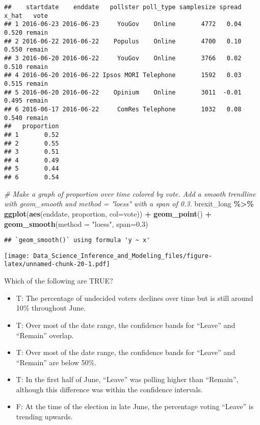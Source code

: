 \documentclass[
]{article}
\newenvironment{Shaded}{\begin{snugshade}}{\end{snugshade}}
\newcommand{\CommentTok}[1]{\textcolor[rgb]{0.56,0.35,0.01}{\textit{#1}}}
\newcommand{\DataTypeTok}[1]{\textcolor[rgb]{0.13,0.29,0.53}{#1}}
\newcommand{\FloatTok}[1]{\textcolor[rgb]{0.00,0.00,0.81}{#1}}
\newcommand{\KeywordTok}[1]{\textcolor[rgb]{0.13,0.29,0.53}{\textbf{#1}}}
\newcommand{\NormalTok}[1]{#1}
\newcommand{\OperatorTok}[1]{\textcolor[rgb]{0.81,0.36,0.00}{\textbf{#1}}}
\newcommand{\StringTok}[1]{\textcolor[rgb]{0.31,0.60,0.02}{#1}}
\providecommand{\tightlist}{%
  \setlength{\itemsep}{0pt}\setlength{\parskip}{0pt}}
\begin{document}
\begin{verbatim}
##    startdate    enddate   pollster poll_type samplesize spread x_hat   vote
## 1 2016-06-23 2016-06-23     YouGov    Online       4772   0.04 0.520 remain
## 2 2016-06-22 2016-06-22    Populus    Online       4700   0.10 0.550 remain
## 3 2016-06-20 2016-06-22     YouGov    Online       3766   0.02 0.510 remain
## 4 2016-06-20 2016-06-22 Ipsos MORI Telephone       1592   0.03 0.515 remain
## 5 2016-06-20 2016-06-22    Opinium    Online       3011  -0.01 0.495 remain
## 6 2016-06-17 2016-06-22     ComRes Telephone       1032   0.08 0.540 remain
##   proportion
## 1       0.52
## 2       0.55
## 3       0.51
## 4       0.49
## 5       0.44
## 6       0.54
\end{verbatim}

\begin{Shaded}
\begin{Highlighting}[]
\CommentTok{\# Make a graph of proportion over time colored by vote. Add a smooth trendline with geom\_smooth and method = "loess" with a span of 0.3.}
\NormalTok{brexit\_long }\OperatorTok{\%\textgreater{}\%}
\StringTok{  }\KeywordTok{ggplot}\NormalTok{(}\KeywordTok{aes}\NormalTok{(enddate, proportion, }\DataTypeTok{col=}\NormalTok{vote)) }\OperatorTok{+}
\StringTok{  }\KeywordTok{geom\_point}\NormalTok{() }\OperatorTok{+}
\StringTok{  }\KeywordTok{geom\_smooth}\NormalTok{(}\DataTypeTok{method =} \StringTok{"loess"}\NormalTok{, }\DataTypeTok{span=}\FloatTok{0.3}\NormalTok{)}
\end{Highlighting}
\end{Shaded}

\begin{verbatim}
## `geom_smooth()` using formula 'y ~ x'
\end{verbatim}

\texttt{[image: Data\_Science\_Inference\_and\_Modeling\_files/figure-latex/unnamed-chunk-20-1.pdf]}

Which of the following are TRUE?

\begin{itemize}
\tightlist
\item
  T: The percentage of undecided voters declines over time but is still
  around 10\% throughout June.
\item
  T: Over most of the date range, the confidence bands for ``Leave'' and
  ``Remain'' overlap.
\item
  T: Over most of the date range, the confidence bands for ``Leave'' and
  ``Remain'' are below 50\%.
\item
  T: In the first half of June, ``Leave'' was polling higher than
  ``Remain'', although this difference was within the confidence
  intervals.
\item
  F: At the time of the election in late June, the percentage voting
  ``Leave'' is trending upwards.
\end{itemize}
\end{document}
